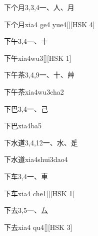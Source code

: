 \begin{entry}{下个月}{3,3,4}{⼀、⼈、⽉}
  \begin{phonetics}{下个月}{xia4 ge4 yue4}[][HSK 4]
  \end{phonetics}
\end{entry}

\begin{entry}{下午}{3,4}{⼀、⼗}
  \begin{phonetics}{下午}{xia4wu3}[][HSK 1]
  \end{phonetics}
\end{entry}

\begin{entry}{下午茶}{3,4,9}{⼀、⼗、⾋}
  \begin{phonetics}{下午茶}{xia4wu3cha2}
  \end{phonetics}
\end{entry}

\begin{entry}{下巴}{3,4}{⼀、⼰}
  \begin{phonetics}{下巴}{xia4ba5}
  \end{phonetics}
\end{entry}

\begin{entry}{下水道}{3,4,12}{⼀、⽔、⾡}
  \begin{phonetics}{下水道}{xia4shui3dao4}
  \end{phonetics}
\end{entry}

\begin{entry}{下车}{3,4}{⼀、⾞}
  \begin{phonetics}{下车}{xia4 che1}[][HSK 1]
  \end{phonetics}
\end{entry}

\begin{entry}{下去}{3,5}{⼀、⼛}
  \begin{phonetics}{下去}{xia4 qu4}[][HSK 3]
  \end{phonetics}
\end{entry}

